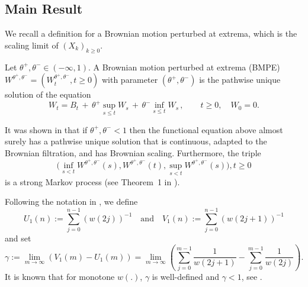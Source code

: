 \documentclass[EJP]{ejpecp} %
\begin{document}




\subsection{Main Result}
We recall a definition for a Brownian motion perturbed at extrema, which is the scaling limit of $(X_k)_{k\geq 0}$.
\begin{definition}
	\label{defn:BMPE}
	Let $\theta^+, \theta^- \in (- \infty , 1)$. A Brownian motion perturbed at
	extrema (BMPE) $W^{\theta^+, \theta^-} = \left(W^{\theta^+, \theta^-}_t, t\geq 0\right)$ with parameter $(\theta^+, \theta^-)$ is the pathwise unique solution of the equation
	\[
	W_t = B_t \,+\, \theta^+ \sup_{s\leq t} W_s  \,+\, \theta^- \inf_{s\leq t} W_s \,,   \qquad t \ge 0, \quad W_0 = 0.
	\]
\end{definition}
It was shown in \cite{PW97, CD99} that if $\theta^+, \theta^- < 1$ then the functional equation above almost surely has a pathwise unique solution that is continuous, adapted to the Brownian filtration, and has Brownian scaling. 
Furthermore, the triple 
$${\big(\inf_{s < t} W^{\theta^{+}, \theta^{-}}(s), 
	W^{\theta^{+}, \theta^{-}}(t) , 
	\sup _{s<t} W^{\theta^{+}, \theta^{-}}(s)\big)}, t \geq 0$$ is a strong Markov process (see Theorem~1 in \cite{PW97}).

Following the notation in \cite{T96}, we define
\[
U_1(n):=\sum_{j=0}^{n-1}(w(2 j))^{-1} \quad \text{and} \quad
V_1(n):=\sum_{j=0}^{n-1}(w(2 j+1))^{-1}
\]
and set
\begin{equation}
	\label{eq: gamma}
	\gamma:= \lim_{m\to \infty}\left( V_1(m) - U_1(m) \right) =\lim_{m\to \infty} \left( \sum_{j=0}^{m-1} \frac{1}{ w(2j+1)}-  \sum_{j=0}^{m-1}  \frac{1}{w(2j)} \right) 
	.\end{equation}
It is known that for monotone $w(.)$, $\gamma$
is well-defined and ${\gamma<1}$, see \cite{T96}. 
\end{document}
